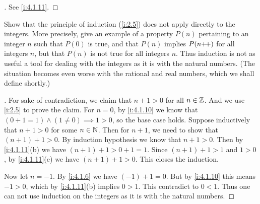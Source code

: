\begin{proof}[]
  See \cref{i:4.1.11}.
\end{proof}

\begin{ex}\label{i:ex:4.1.8}
  Show that the principle of induction (\cref{i:2.5}) does not apply directly to the integers.
  More precisely, give an example of a property \(P(n)\) pertaining to an integer \(n\) such that \(P(0)\) is true, and that \(P(n)\) implies \(P(n{+}\!{+})\) for all integers \(n\), but that \(P(n)\) is not true for all integers \(n\).
  Thus induction is not as useful a tool for dealing with the integers as it is with the natural numbers.
  (The situation becomes even worse with the rational and real numbers, which we shall define shortly.)
\end{ex}

\begin{proof}[]
  For sake of contradiction, we claim that \(n + 1 > 0\) for all \(n \in \mathbb{Z}\).
  And we use \cref{i:2.5} to prove the claim.
  For \(n = 0\), by \cref{i:4.1.10} we know that \((0 + 1 = 1) \land (1 \neq 0) \implies 1 > 0\), so the base case holds.
  Suppose inductively that \(n + 1 > 0\) for some \(n \in \mathbb{N}\).
  Then for \(n + 1\), we need to show that \((n + 1) + 1 > 0\).
  By induction hypothesis we know that \(n + 1 > 0\).
  Then by \cref{i:4.1.11}(b) we have \((n + 1) + 1 > 0 + 1 = 1\).
  Since \((n + 1) + 1 > 1\) and \(1 > 0\), by \cref{i:4.1.11}(e) we have \((n + 1) + 1 > 0\).
  This closes the induction.

  Now let \(n = -1\).
  By \cref{i:4.1.6} we have \((-1) + 1 = 0\).
  But by \cref{i:4.1.10} this means \(-1 > 0\), which by \cref{i:4.1.11}(b) implies \(0 > 1\).
  This contradict to \(0 < 1\).
  Thus one can not use induction on the integers as it is with the natural numbers.
\end{proof}
